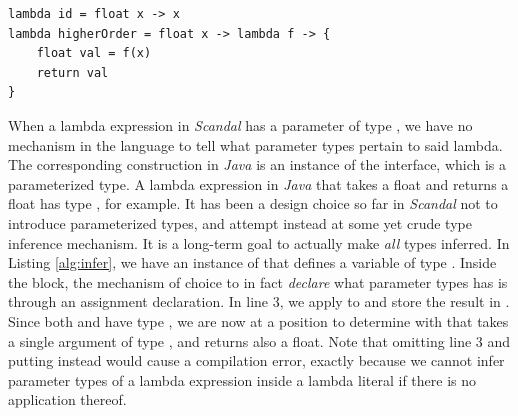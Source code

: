 \begin{lstlisting}[emph={lambda,float,return},emphstyle={\textbf},caption={Type inference in \emph{Scandal}.},label={alg:infer}]
lambda id = float x -> x
lambda higherOrder = float x -> lambda f -> {
	float val = f(x)
	return val
}
\end{lstlisting}

When a lambda expression in \emph{Scandal} has a parameter of type , we have no mechanism in the language to tell what parameter types pertain to said lambda. The corresponding construction in \emph{Java} is an instance of the  interface, which is a parameterized type. A lambda expression in \emph{Java} that takes a float and returns a float has type , for example. It has been a design choice so far in \emph{Scandal} not to introduce parameterized types, and attempt instead at some yet crude type inference mechanism. It is a long-term goal to actually make \emph{all} types inferred. In Listing \ref{alg:infer}, we have an instance of  that defines a variable  of type . Inside the block, the mechanism of choice to in fact \emph{declare} what parameter types  has is through an assignment declaration. In line 3, we apply  to  and store the result in . Since both  and  have type , we are now at a position to determine with that  takes a single argument of type , and returns also a float. Note that omitting line 3 and putting  instead would cause a compilation error, exactly because we cannot infer parameter types of a lambda expression inside a lambda literal if there is no application thereof.

